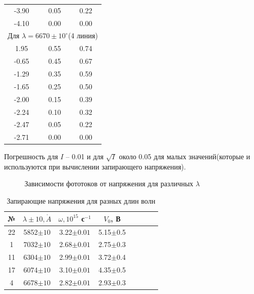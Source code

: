 \documentclass[12pt]{kiarticle} %
\begin{document}
\begin{table}[h!]
\begin{center}
\begin{tabular}{|c|c|c|}
            -3.90 & 0.05 & 0.22 \\
            -4.10 & 0.00 & 0.00 \\
            \hline 
            \multicolumn{3}{|c|}{Для $ \lambda = 6670\pm10^\circ $(4 линия)} \\
            \hline
            1.95 & 0.55 & 0.74 \\
            -0.65 & 0.45 & 0.67 \\
            -1.29 & 0.35 & 0.59 \\
            -1.65 & 0.25 & 0.50 \\
            -2.00 & 0.15 & 0.39 \\
            -2.24 & 0.10 & 0.32 \\
            -2.47 & 0.05 & 0.22 \\
            -2.71 & 0.00 & 0.00 \\
            \hline
        \end{tabular} 
    \end{center}
    \label{}
\end{table}

Погрешность для $I$ -- 0.01 и для $\sqrt I$ около 0.05 для малых значений(которые и используются при вычислении запирающего напряжения).

\FloatBarrier


\begin{figure}[h!]
    \centering
    
    \caption{Зависимости фототоков от напряжения для различных $\lambda$}
    \label{grad}
\end{figure}

\begin{table}[h!]
    \caption{Запирающие напряжения для разных длин волн}
    \begin{center}
        \begin{tabular}{|c|c|c|c|c|c|c|c|}
            \hline
            № & $ \lambda\pm10, \mathring{A} $ &  $ \omega, 10^{15} $ с$^{-1}$ & $ V_0 $, В \\
            \hline
            22 & 5852$\pm10$ & 3.22$\pm0.01$ & 5.15$\pm$0.5 \\
            1  & 7032$\pm10$ & 2.68$\pm0.01$ & 2.75$\pm$0.3 \\
            11 & 6304$\pm10$ & 2.99$\pm0.01$ & 3.72$\pm$0.4 \\
            17 & 6074$\pm10$ & 3.10$\pm0.01$ & 4.35$\pm$0.5 \\
            4  & 6678$\pm10$ & 2.82$\pm0.01$ & 2.93$\pm$0.3 \\
            \hline
        \end{tabular} 
    \end{center}
    \label{}
\end{table}
\end{document}
